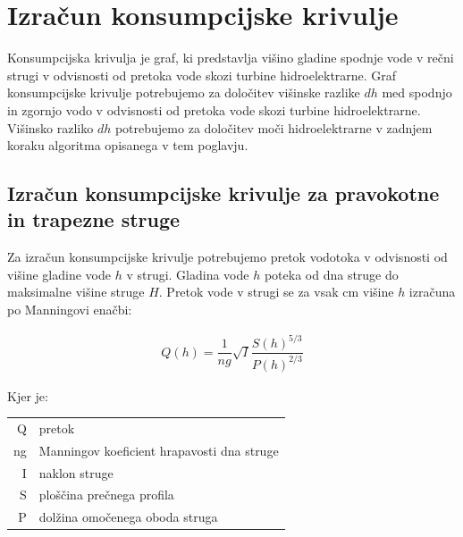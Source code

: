 \section{Izračun konsumpcijske krivulje}
Konsumpcijska krivulja je graf, ki predstavlja višino gladine spodnje vode v rečni strugi v odvisnosti od pretoka vode skozi turbine hidroelektrarne. Graf konsumpcijske krivulje potrebujemo za določitev višinske razlike $dh$ med spodnjo in zgornjo vodo v odvisnosti od pretoka vode skozi turbine hidroelektrarne. Višinsko razliko $dh$ potrebujemo za določitev moči hidroelektrarne v zadnjem koraku algoritma opisanega v tem poglavju.



\subsection{Izračun konsumpcijske krivulje za pravokotne in trapezne struge} \label{sec:teorija_trapeznaMetoda}
Za izračun konsumpcijske krivulje potrebujemo pretok vodotoka v odvisnosti od višine gladine vode $h$ v strugi. Gladina vode $h$ poteka od dna struge do maksimalne višine struge $H$. Pretok vode v strugi se za vsak cm višine $h$ izračuna po Manningovi enačbi:

\begin{ceqn}
\begin{align}
Q(h) = \dfrac{1}{ng} \sqrt{I}\dfrac{S(h)^{5/3}}{P(h)^{2/3}} \label{eq:ManningovaEnacba}
\end{align}
\end{ceqn}

Kjer je:

\begin{table}[htb!]
	\begin{tabular}{r|p{10cm}}
		Q & pretok \\
		ng & Manningov koeficient hrapavosti dna struge\\
		I & naklon struge \\
		S & ploščina prečnega profila \\
		P & dolžina omočenega oboda struga
	\end{tabular}
\end{table}



